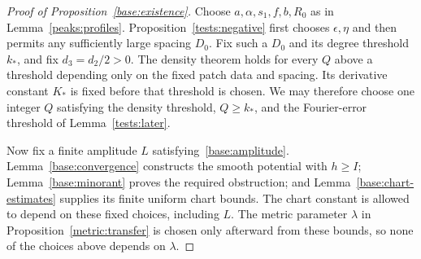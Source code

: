 \begin{proof}[Proof of Proposition~\ref{base:existence}]
Choose $a,\alpha,s_1,f,b,R_0$ as in Lemma~\ref{peaks:profiles}.
Proposition~\ref{tests:negative} first chooses $\epsilon,\eta$ and
then permits any sufficiently large spacing $D_0$.  Fix such a
$D_0$ and its degree threshold $k_*$, and fix
$d_3=d_2/2>0$.  The density theorem holds for every $Q$ above a
threshold depending only on the fixed patch data and spacing.
Its derivative constant $K_*$ is fixed before that threshold is
chosen.  We may therefore choose one integer $Q$ satisfying the
density threshold, $Q\ge k_*$, and the Fourier-error threshold of
Lemma~\ref{tests:later}.

Now fix a finite amplitude $L$ satisfying~\eqref{base:amplitude}.
Lemma~\ref{base:convergence} constructs the smooth potential with
$h\ge I$; Lemma~\ref{base:minorant} proves the required obstruction;
and Lemma~\ref{base:chart-estimates} supplies its finite uniform
chart bounds.  The chart constant is allowed to depend on these
fixed choices, including $L$.  The metric parameter $\lambda$ in
Proposition~\ref{metric:transfer} is chosen only afterward from
these bounds, so none of the choices above depends on $\lambda$.
\end{proof}
